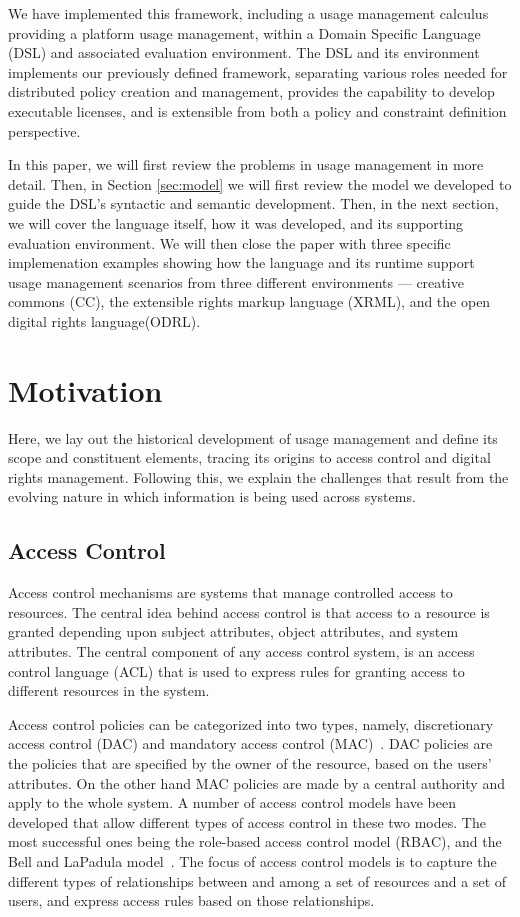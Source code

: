 We have implemented this framework, including a usage management calculus providing a platform usage management, within a Domain Specific Language (DSL) and associated evaluation environment. The DSL and its environment implements our previously defined framework, separating various roles needed for distributed policy creation and management, provides the capability to develop executable licenses, and is extensible from both a policy and constraint definition perspective.

In this paper, we will first review the problems in usage management in more detail.  Then, in Section \ref{sec:model} we will first review the model we developed to guide the DSL's syntactic and semantic development.  Then, in the next section, we will cover the language itself, how it was developed, and its supporting evaluation environment.  We will then close the paper with three specific implemenation examples showing how the language and its runtime support usage management scenarios from three different environments --- creative commons (CC), the extensible rights markup language (XRML), and the open digital rights language(ODRL).

\section{Motivation}\label{sec:motivation}
Here, we lay out the historical development of usage management and define its scope and constituent elements, tracing its origins to access control and digital rights management. Following this, we explain the challenges that result from the evolving nature in which information is being used across systems. 

\subsection{Access Control}
Access control mechanisms are systems that manage controlled access to resources. The central idea behind access control is that access to a resource is granted depending upon subject attributes, object attributes, and system attributes. The central component of any access control system, is an access control language (ACL) that is used to express rules for granting access to different resources in the system.

Access control policies can be categorized into two types, namely, discretionary access control (DAC) and mandatory access control (MAC)~\cite{HuFeKu:06}. DAC policies are  the policies that are specified by the owner of the resource, based on the users' attributes. On the other hand MAC policies are made by a central authority and apply to the whole system.  A number of access control models have been developed that allow different types of access control in these two modes. The most successful ones being the role-based access control model (RBAC), and the Bell and LaPadula model~\cite{BL:73,BL:76}. The focus of access control models is to capture the different types of relationships between and among a set of resources and a set of users, and express access rules based on those relationships. 

